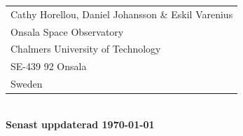 \begin{titlepage}
\begin{center}
\begin{tabular}{l}
Cathy Horellou, Daniel Johansson \& Eskil Varenius\\
Onsala Space Observatory		\\
Chalmers University of Technology	\\
SE-439 92 Onsala			\\
Sweden					\\
\end{tabular}\\
\vspace{0.5cm}
\yyyymmdddate
{\bf Senast uppdaterad \today \, \currenttime}
\end{center}

\end{titlepage}

